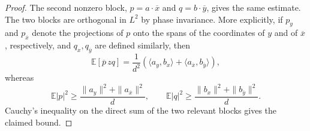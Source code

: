 \documentclass[10pt,a4paper]{amsart}
\newcommand{\E}{\mathbb{E}}
\begin{document}
\begin{proof}
The second nonzero block, $p=a\cdot\overline x$ and $q=b\cdot\overline y$, gives the same estimate. The two blocks are orthogonal in $L^2$ by phase invariance. More explicitly, if $p_y$ and $p_{\overline x}$ denote the projections of $p$ onto the spans of the coordinates of $y$ and of $\overline x$, respectively, and $q_x,q_{\overline y}$ are defined similarly, then
\[
\E[\overline p\,zq]
=
\frac1{d^2}
\left(\langle a_y,b_x\rangle+\langle a_{\overline x},b_{\overline y}\rangle\right),
\]
whereas
\[
\E|p|^2\ge \frac{\|a_y\|^2+\|a_{\overline x}\|^2}{d},
\qquad
\E|q|^2\ge \frac{\|b_x\|^2+\|b_{\overline y}\|^2}{d}.
\]
Cauchy's inequality on the direct sum of the two relevant blocks gives the claimed bound.
\end{proof}
\end{document}
